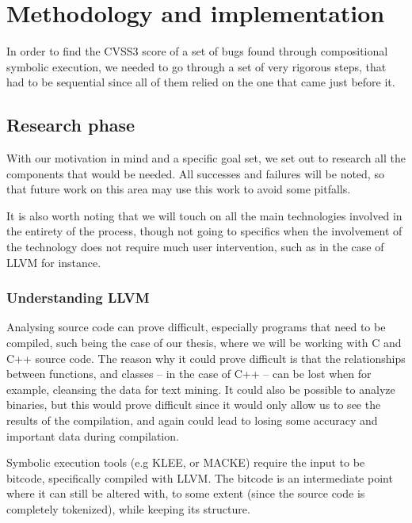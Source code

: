 

\chapter{Methodology and implementation}\label{chapter:Methodology and implementation}

In order to find the CVSS3 score of a set of bugs found through compositional symbolic execution, we needed to go through a set of very rigorous steps, that had to be sequential since all of them relied on the one that came just before it.

\section{Research phase}

With our motivation in mind and a specific goal set, we set out to research all the components that would be needed. All successes and failures will be noted, so that future work on this area may use this work to avoid some pitfalls.

It is also worth noting that we will touch on all the main technologies involved in the entirety of the process, though not going to specifics when the involvement of the technology does not require much user intervention, such as in the case of LLVM for instance.

\subsection{Understanding LLVM}

Analysing source code can prove difficult, especially programs that need to be compiled, such being the case of our thesis, where we will be working with C and C++ source code. The reason why it could prove difficult is that the relationships between functions, and classes -- in the case of C++ -- can be lost when for example, cleansing the data for text mining. It could also be possible to analyze binaries, but this would prove difficult since it would only allow us to see the results of the compilation, and again could lead to losing some accuracy and important data during compilation.

Symbolic execution tools (e.g KLEE, or MACKE) require the input to be bitcode, specifically compiled with LLVM. The bitcode is an intermediate point where it can still be altered with, to some extent (since the source code is completely tokenized), while keeping its structure.

